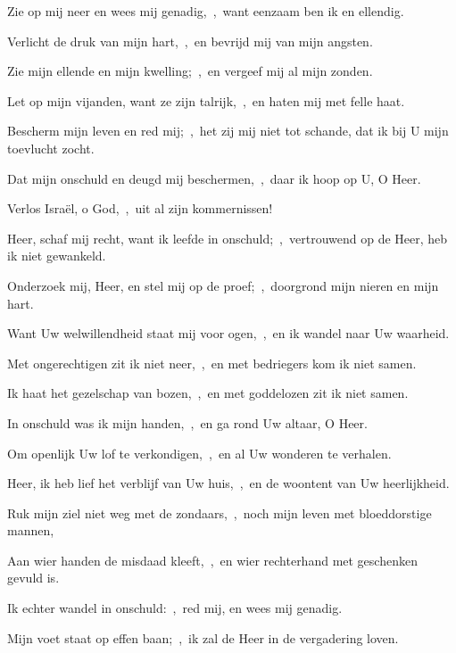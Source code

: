 \documentclass[12pt,twoside,a5paper]{article}
\begin{document}
\begin{halfparskip}
  Zie op mij neer en wees mij genadig,~\sep\ want eenzaam ben ik en ellendig.

  Verlicht de druk van mijn hart,~\sep\ en bevrijd mij van mijn angsten.

  Zie mijn ellende en mijn kwelling;~\sep\ en vergeef mij al mijn zonden.

  Let op mijn vijanden, want ze zijn talrijk,~\sep\ en haten mij met felle haat.

  Bescherm mijn leven en red mij;~\sep\ het zij mij niet tot schande, dat ik bij U mijn toevlucht zocht.

  Dat mijn onschuld en deugd mij beschermen,~\sep\ daar ik hoop op U, O Heer.

  Verlos Israël, o God,~\sep\ uit al zijn kommernissen!
\end{halfparskip}



\begin{halfparskip}
  Heer, schaf mij recht, want ik leefde in onschuld;~\sep\ vertrouwend op de Heer, heb ik niet gewankeld.


  Onderzoek mij, Heer, en stel mij op de proef;~\sep\ doorgrond mijn nieren en mijn hart.

  Want Uw welwillendheid staat mij voor ogen,~\sep\ en ik wandel naar Uw waarheid.

  Met ongerechtigen zit ik niet neer,~\sep\ en met bedriegers kom ik niet samen.

  Ik haat het gezelschap van bozen,~\sep\ en met goddelozen zit ik niet samen.

  In onschuld was ik mijn handen,~\sep\ en ga rond Uw altaar, O Heer.

  Om openlijk Uw lof te verkondigen,~\sep\ en al Uw wonderen te verhalen.

  Heer, ik heb lief het verblijf van Uw huis,~\sep\ en de woontent van Uw heerlijkheid.
\end{halfparskip}


\begin{halfparskip}
  Ruk mijn ziel niet weg met de zondaars,~\sep\ noch mijn leven met bloeddorstige mannen,

  Aan wier handen de misdaad kleeft,~\sep\ en wier rechterhand met geschenken gevuld is.

  Ik echter wandel in onschuld:~\sep\ red mij, en wees mij genadig.

  Mijn voet staat op effen baan;~\sep\ ik zal de Heer in de vergadering loven.
\end{halfparskip}
\end{document}
